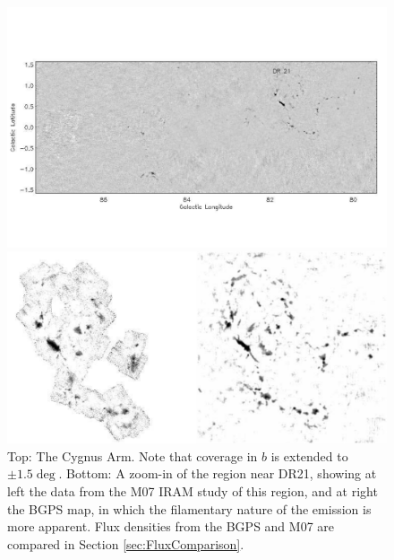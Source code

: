 \documentclass[12pt,preprint]{aastex}
\begin{document}
\begin{figure}
  \includegraphics[scale=0.7]{f19d} 
  \begin{center}
  \includegraphics[scale=0.8]{f19j}
  \end{center}
  \caption{Top: The Cygnus Arm. Note that coverage in $b$ is extended
  to $\pm 1.5\deg$. Bottom: A zoom-in of the region near DR21, showing
  at left the data from the M07 IRAM study of this region, and at
  right the BGPS map, in which the filamentary nature of the emission
  is more apparent.  Flux densities from the BGPS and M07 are compared
  in Section \ref{sec:FluxComparison}.}

  \label{fig:MontD}

\end{figure}

\addtocounter{figure}{-1}
\addtocounter{subfig}{1}
\end{document}
